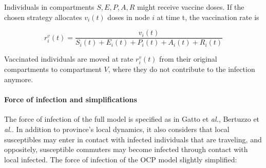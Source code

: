 Individuals in compartments $S, E, P, A, R$ might receive vaccine doses. If the chosen strategy allocates $v_{i}(t)$ doses in node $i$ at time t, the vaccination rate is

\begin{equation}
r^v_i(t) = \frac{v_{i}(t)}{S_i(t) +  E_i(t) + P_i(t) + A_i(t) + R_i(t)}
\end{equation}

Vaccinated individuals are moved at rate $r^v_i(t)$ from their original compartments to compartment $V$, where they do not contribute to the infection anymore.

\paragraph{Force of infection and simplifications}
The force of infection of the full model is specified as in Gatto et \textit{al.}\cite{Gatto:SpreadDynamicsCOVID19:2020}, Bertuzzo et \textit{al.}\cite{Bertuzzo:GeographyCOVID19Spread:2020}. In addition to province's local dynamics, it also considers that local susceptibles may enter in contact with infected individuals that are traveling, and oppositely, susceptible commuters may become infected through contact with local infected. The force of infection of the OCP model slightly simplified:

